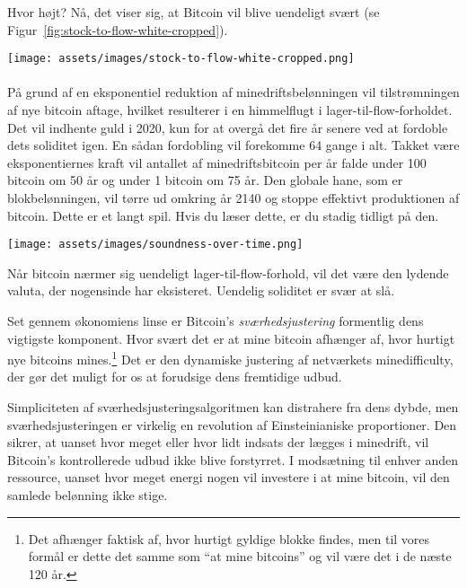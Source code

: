 Hvor højt? Nå, det viser sig, at Bitcoin vil blive uendeligt svært (se
Figur~\ref{fig:stock-to-flow-white-cropped}).

\begin{center}
  \texttt{[image: assets/images/stock-to-flow-white-cropped.png]}
  \label{fig:stock-to-flow-white-cropped}
\end{center}

\paragraph{}
På grund af en eksponentiel reduktion af minedriftsbelønningen vil tilstrømningen af nye
bitcoin aftage, hvilket resulterer i en himmelflugt i lager-til-flow-forholdet.
Det vil indhente guld i 2020, kun for at overgå det fire år senere ved at
fordoble dets soliditet igen. En sådan fordobling vil forekomme 64 gange i
alt. Takket være eksponentiernes kraft vil antallet af minedriftsbitcoin
per år falde under 100 bitcoin om 50 år og under 1 bitcoin om
75 år. Den globale hane, som er blokbelønningen, vil tørre ud
omkring år 2140 og stoppe effektivt produktionen af
bitcoin. Dette er et langt spil. Hvis du læser dette, er du stadig
tidligt på den.

\begin{center}
  \texttt{[image: assets/images/soundness-over-time.png]}
  \label{fig:soundness-over-time}
\end{center}

Når bitcoin nærmer sig uendeligt lager-til-flow-forhold, vil det være den
lydende valuta, der nogensinde har eksisteret. Uendelig soliditet er svær at slå.

Set gennem økonomiens linse er Bitcoin's \textit{sværhedsjustering}
formentlig dens vigtigste komponent. Hvor svært det er at mine bitcoin afhænger
af, hvor hurtigt nye bitcoins mines.\footnote{Det afhænger faktisk af, hvor
hurtigt gyldige blokke findes, men til vores formål er dette det samme som
\enquote{at mine bitcoins} og vil være det i de næste 120 år.} Det er den dynamiske
justering af netværkets minedifficulty, der gør det muligt for os at forudsige dens
fremtidige udbud.

Simpliciteten af sværhedsjusteringsalgoritmen kan distrahere fra dens dybde,
men sværhedsjusteringen er virkelig en revolution af Einsteinianiske proportioner.
Den sikrer, at uanset hvor meget eller hvor lidt indsats der lægges i minedrift, vil Bitcoin's kontrollerede udbud ikke blive forstyrret. I modsætning til enhver anden ressource, uanset hvor meget
energi nogen vil investere i at mine bitcoin, vil den samlede belønning ikke
stige.

